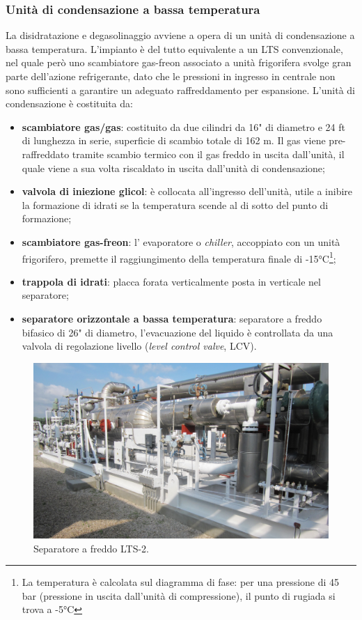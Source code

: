 \subsubsection*{Unità di condensazione a bassa temperatura}
La disidratazione e degasolinaggio avviene a opera di un unità di condensazione a bassa temperatura. L'impianto è del tutto equivalente a un LTS convenzionale, nel quale però uno scambiatore gas-freon associato a unità frigorifera svolge gran parte dell'azione refrigerante, dato che le pressioni in ingresso in centrale non sono sufficienti a garantire un adeguato raffreddamento per espansione. L'unità di condensazione è costituita da:
\begin{itemize}
	\item \textbf{scambiatore gas/gas}: costituito da due cilindri da 16" di diametro e 24 ft di lunghezza in serie, superficie di scambio totale di 162 m. Il gas viene pre-raffreddato tramite scambio termico con il gas freddo in uscita dall'unità, il quale viene a sua volta riscaldato in uscita dall'unità di condensazione;
	\item \textbf{valvola di iniezione glicol}: è collocata all'ingresso dell'unità, utile a inibire la formazione di idrati se la temperatura scende al di sotto del punto di formazione;
	\item \textbf{scambiatore gas-freon}: l' evaporatore o \textit{chiller}, accoppiato con un unità frigorifero, premette il raggiungimento della temperatura finale di -15°C\footnote{La temperatura è calcolata sul diagramma di fase: per una pressione di 45 bar (pressione in uscita dall'unità di compressione), il punto di rugiada si trova a -5°C};
	\item \textbf{trappola di idrati}: placca forata verticalmente posta in verticale nel separatore;
	\item \textbf{separatore orizzontale a bassa temperatura}: separatore a freddo bifasico di 26" di diametro, l'evacuazione del liquido è controllata da una valvola di regolazione livello (\textit{level control valve}, LCV).
\end{itemize}

\begin{figure}[htbp] 
    \centering
    \includegraphics[width=.8\textwidth]{fig/test/centrale/lts.jpg}
    \caption{Separatore a freddo LTS-2.} 
    \label{fig:centrale-lts}
\end{figure}


